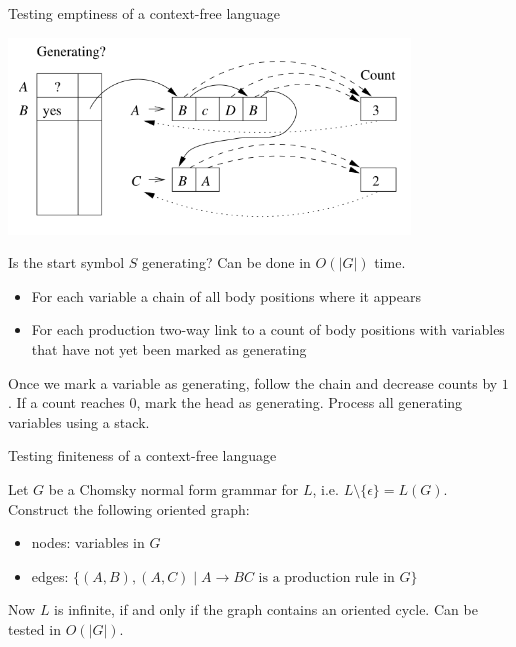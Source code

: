 \documentclass[handout]{beamer}
\begin{document}
\begin{frame}{Testing emptiness of a context-free language}

    \vspace{-4pt}
    \begin{center}
        \includegraphics[width=0.8\textwidth]{files/emptyCFL.PNG}    
    \end{center}
    \vspace{-18pt}
    Is the start symbol $S$ generating? Can be done in $O(|G|)$ time. 
    \vspace{-4pt}   
    \begin{itemize}
        \item For each variable a chain of all body positions where it appears
        \item For each production two-way link to a count of body positions with variables that have not yet been marked as generating
    \end{itemize}
    \vspace{-4pt}
    Once we mark a variable as generating, follow the chain and decrease counts by $1$. If a count reaches $0$, mark the head as generating. Process all generating variables using a stack.
    
\end{frame}


\begin{frame}{Testing finiteness of a context-free language}

    Let $G$ be a Chomsky normal form grammar for $L$, i.e. $L\setminus\{\epsilon\}=L(G)$. Construct the following oriented graph: 
    \begin{itemize}
        \item nodes: variables in $G$
        \item edges: $\{(A,B),(A,C) \mid A\rightarrow BC\text{ is a production rule in }G\}$
    \end{itemize}
    Now $L$ is infinite, if and only if the graph contains an oriented cycle. Can be tested in $O(|G|)$.


\end{frame}
\end{document}
